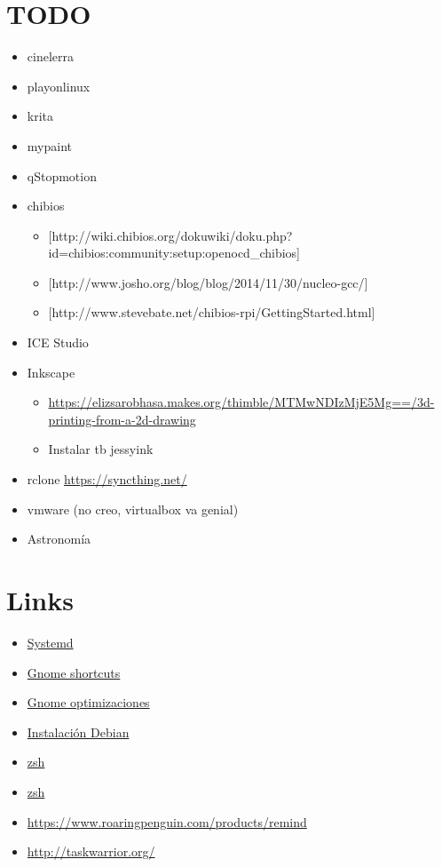 \documentclass[12pt,spanish,]{article}
\providecommand{\tightlist}{%
  \setlength{\itemsep}{0pt}\setlength{\parskip}{0pt}}
\begin{document}
\section{TODO}\label{todo-1}

\begin{itemize}
\tightlist
\item
  cinelerra
\item
  playonlinux
\item
  krita
\item
  mypaint
\item
  qStopmotion
\item
  chibios

  \begin{itemize}
  \tightlist
  \item
    {[}http://wiki.chibios.org/dokuwiki/doku.php?id=chibios:community:setup:openocd\_chibios{]}
  \item
    {[}http://www.josho.org/blog/blog/2014/11/30/nucleo-gcc/{]}
  \item
    {[}http://www.stevebate.net/chibios-rpi/GettingStarted.html{]}
  \end{itemize}
\item
  ICE Studio
\item
  Inkscape

  \begin{itemize}
  \tightlist
  \item
    \url{https://elizsarobhasa.makes.org/thimble/MTMwNDIzMjE5Mg==/3d-printing-from-a-2d-drawing}
  \item
    Instalar tb jessyink
  \end{itemize}
\item
  rclone \url{https://syncthing.net/}
\item
  vmware (no creo, virtualbox va genial)
\item
  Astronomía
\end{itemize}

\section{Links}\label{links}

\begin{itemize}
\tightlist
\item
  \href{https://wiki.debian.org/systemd}{Systemd}
\item
  \href{https://wiki.gnome.org/Design/OS/KeyboardShortcuts}{Gnome
  shortcuts}
\item
  \href{https://www.linux.com/learn/easy-steps-make-gnome-3-more-efficient}{Gnome
  optimizaciones}
\item
  \href{https://diversidadyunpocodetodo.blogspot.com.es/2015/03/sensores-temperatura-hardware-discos-cpu-debian-ubuntu.html}{Instalación
  Debian}
\item
  \href{http://joshldavis.com/2014/07/26/oh-my-zsh-is-a-disease-antigen-is-the-vaccine/}{zsh}
\item
  \href{http://blog.namangoel.com/zsh-with-antigen}{zsh}
\item
  \url{https://www.roaringpenguin.com/products/remind}
\item
  \url{http://taskwarrior.org/}
\end{itemize}
\end{document}
